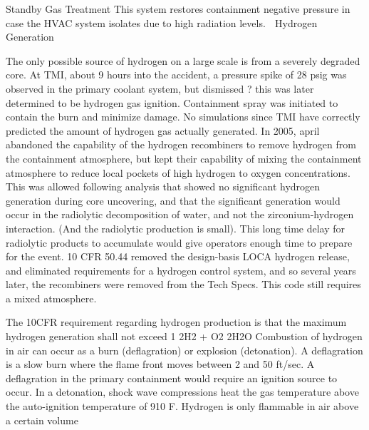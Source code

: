 \documentclass[10pt]{article}
\begin{document}
Standby Gas Treatment
This system restores containment negative pressure in case the HVAC system isolates due to high radiation levels. 
Hydrogen Generation

The only possible source of hydrogen on a large scale is from a severely degraded core. At TMI, about 9 hours into the accident, a pressure spike of 28 psig was observed in the primary coolant system, but dismissed ? this was later determined to be hydrogen gas ignition. Containment spray was initiated to contain the burn and minimize damage. No simulations since TMI have correctly predicted the amount of hydrogen gas actually generated. In 2005, april abandoned the capability of the hydrogen recombiners to remove hydrogen from the containment atmosphere, but kept their capability of mixing the containment atmosphere to reduce local pockets of high hydrogen to oxygen concentrations. This was allowed following analysis that showed no significant hydrogen generation during core uncovering, and that the significant generation would occur in the radiolytic decomposition of water, and not the zirconium-hydrogen interaction. (And the radiolytic production is small). This long time delay for radiolytic products to accumulate would give operators enough time to prepare for the event. 10 CFR 50.44 removed the design-basis LOCA hydrogen release, and eliminated requirements for a hydrogen control system, and so several years later, the recombiners were removed from the Tech Specs. This code still requires a mixed atmosphere. 

The 10CFR requirement regarding hydrogen production is that the maximum hydrogen generation shall not exceed 1%
2H2 + O2  2H2O
Combustion of hydrogen in air can occur as a burn (deflagration) or explosion (detonation). A deflagration is a slow burn where the flame front moves between 2 and 50 ft/sec. A deflagration in the primary containment would require an ignition source to occur. In a detonation, shock wave compressions heat the gas temperature above the auto-ignition temperature of 910 F. Hydrogen is only flammable in air above a certain volume %
\end{document}
